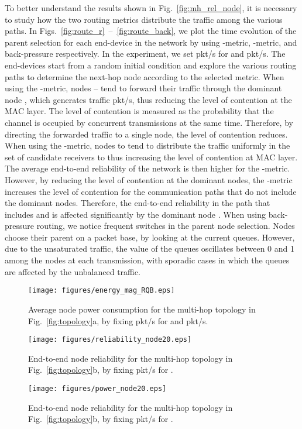 \documentclass[review, 1p, 11pt]{elsarticle}
\numberwithin{equation}{section}
\begin{document}
To better  understand the results shown in Fig.~\ref{fig:mh_rel_node}, it is necessary to study how the two routing metrics distribute the traffic among the various paths.
In Figs.~\ref{fig:route_r}~--~\ref{fig:route_back}, we plot the time evolution of the parent selection for each end-device in the network by using -metric, -metric, and back-pressure respectively. In the experiment, we set  pkt/s for  and  pkt/s. The end-devices start from a random initial condition and explore the various routing paths to determine the next-hop node according to the selected metric. When using the -metric, nodes -- tend to forward their traffic through the dominant node
, which generates traffic  pkt/s, thus reducing the level of contention at the MAC layer.
The level of contention is measured as the probability that the channel is occupied by concurrent transmissions at the same time.
Therefore, by directing the forwarded traffic to a single node, the level of contention reduces.
When using the -metric,  nodes  to  tend to distribute the traffic uniformly in the set of candidate receivers  to  thus increasing the level of contention at MAC layer. The average end-to-end reliability of the network is then higher for the -metric. However, by reducing the level of contention at the dominant nodes, the -metric increases the level of contention for the communication paths that do not include the dominant nodes. Therefore, the end-to-end reliability in the path that includes  and  is affected significantly by the dominant node .
When using back-pressure routing, we notice frequent switches in the parent node selection. Nodes choose their parent on a packet base, by looking at the current queues. However, due to the unsaturated traffic, the value of the queues oscillates between 0 and 1 among the nodes at each transmission, with sporadic cases in which the queues are affected by the unbalanced traffic.









\begin{figure}[h] \centering
\texttt{[image: figures/energy\_mag\_RQB.eps]}
\caption{Average node power consumption for the multi-hop
topology in Fig.~\ref{fig:topology}a, by fixing  pkt/s for  and  pkt/s.\label{fig:mh_ene_node}}
\end{figure}



\begin{figure}[h!] \centering
\texttt{[image: figures/reliability\_node20.eps]}
\caption{End-to-end node reliability for the multi-hop
topology in Fig.~\ref{fig:topology}b, by fixing  pkt/s for .\label{fig:mh_rel_node20}}
\texttt{[image: figures/power\_node20.eps]}
\caption{End-to-end node reliability for the multi-hop
topology in Fig.~\ref{fig:topology}b, by fixing  pkt/s for .\label{fig:mh_pow_node20}}
\end{figure}
\end{document}
